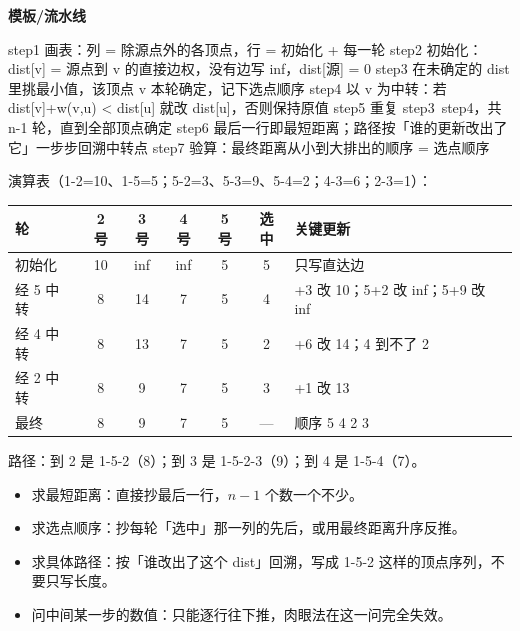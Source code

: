 \documentclass[10pt,a4paper]{ctexart}
\begin{document}

\textbf{模板/流水线}

\begin{codebox}
step1  画表：列 = 除源点外的各顶点，行 = 初始化 + 每一轮
step2  初始化：dist[v] = 源点到 v 的直接边权，没有边写 inf，dist[源] = 0
step3  在未确定的 dist 里挑最小值，该顶点 v 本轮确定，记下选点顺序
step4  以 v 为中转：若 dist[v]+w(v,u) < dist[u] 就改 dist[u]，否则保持原值
step5  重复 step3~step4，共 n-1 轮，直到全部顶点确定
step6  最后一行即最短距离；路径按「谁的更新改出了它」一步步回溯中转点
step7  验算：最终距离从小到大排出的顺序 = 选点顺序
\end{codebox}

演算表（1-2=10、1-5=5；5-2=3、5-3=9、5-4=2；4-3=6；2-3=1）：

\begin{center}\small
\begin{tabularx}{\linewidth}{@{}lccccc>{\raggedright\arraybackslash}X@{}}
\toprule
轮 & 2 号 & 3 号 & 4 号 & 5 号 & 选中 & 关键更新 \\
\midrule
初始化 & 10 & inf & inf & 5 & 5 & 只写直达边 \\
经 5 中转 & 8 & 14 & 7 & 5 & 4 & 5+3 改 10；5+2 改 inf；5+9 改 inf \\
经 4 中转 & 8 & 13 & 7 & 5 & 2 & 7+6 改 14；4 到不了 2 \\
经 2 中转 & 8 & 9 & 7 & 5 & 3 & 8+1 改 13 \\
最终 & 8 & 9 & 7 & 5 & — & 顺序 5 4 2 3 \\
\bottomrule
\end{tabularx}
\end{center}

路径：到 2 是 1-5-2（8）；到 3 是 1-5-2-3（9）；到 4 是 1-5-4（7）。


\begin{itemize}

\item 求最短距离：直接抄最后一行，$n-1$ 个数一个不少。

\item 求选点顺序：抄每轮「选中」那一列的先后，或用最终距离升序反推。

\item 求具体路径：按「谁改出了这个 dist」回溯，写成 1-5-2 这样的顶点序列，不要只写长度。

\item 问中间某一步的数值：只能逐行往下推，肉眼法在这一问完全失效。

\end{itemize}
\end{document}
